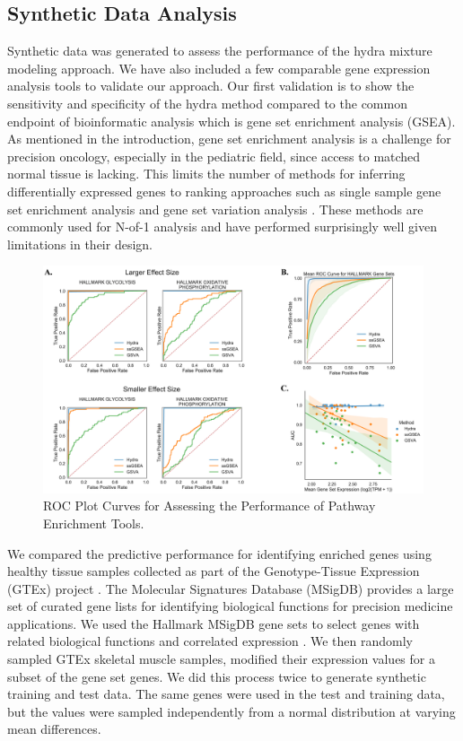 \documentclass[fleqn,10pt]{wlscirep}
\begin{document}
\subsection*{Synthetic Data Analysis}
Synthetic data was generated to assess the performance of the hydra mixture modeling approach. We have also included a few comparable gene expression analysis tools to validate our approach. Our first validation is to show the sensitivity and specificity of the hydra method compared to the common endpoint of bioinformatic analysis which is gene set enrichment analysis (GSEA). As mentioned in the introduction, gene set enrichment analysis is a challenge for precision oncology, especially in the pediatric field, since access to matched normal tissue is lacking. This limits the number of methods for inferring differentially expressed genes to ranking approaches such as single sample gene set enrichment analysis \cite{barbie2009systematic} and gene set variation analysis \cite{hanzelmann2013gsva}. These methods are commonly used for N-of-1 analysis and have performed surprisingly well given limitations in their design.


\begin{figure}
	\centering
	\includegraphics[width=0.75\linewidth]{images/figure-2-roc-curves@2x.png}
	\caption{ROC Plot Curves for Assessing the Performance of Pathway Enrichment Tools.}
	\label{sfig:rocplot}
\end{figure}

We compared the predictive performance for identifying enriched genes using healthy tissue samples collected as part of the Genotype-Tissue Expression (GTEx) project \cite{lonsdale2013genotype}. The Molecular Signatures Database (MSigDB) provides a large set of curated gene lists for identifying biological functions for precision medicine applications. We used the Hallmark MSigDB gene sets to select genes with related biological functions and correlated expression \cite{liberzon2015molecular}. We then randomly sampled GTEx skeletal muscle samples, modified their expression values for a subset of the gene set genes. We did this process twice to generate synthetic training and test data. The same genes were used in the test and training data, but the values were sampled independently from a normal distribution at varying mean differences. 
\end{document}
